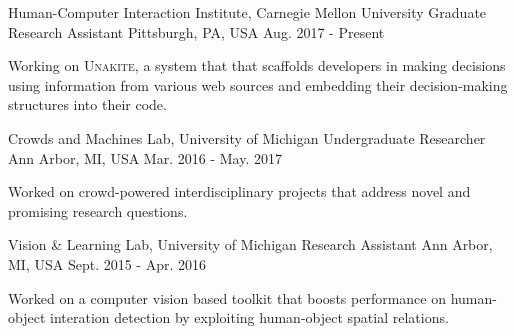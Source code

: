 
\begin{cventries}
\cventry
  {Human-Computer Interaction Institute, Carnegie Mellon University} %
  {Graduate Research Assistant} %
  {Pittsburgh, PA, USA} %
  {Aug. 2017 - Present} %
  {
    \begin{cvitems} %
      \item {Working on \textsc{Unakite}, a system that that scaffolds developers in making decisions using information from various web sources and embedding their decision-making structures into their code.}
    \end{cvitems}
  }

\cventry
  {Crowds and Machines Lab, University of Michigan} %
  {Undergraduate Researcher} %
  {Ann Arbor, MI, USA} %
  {Mar. 2016 - May. 2017} %
  {
    \begin{cvitems} %
      \item {Worked on crowd-powered interdisciplinary projects that address novel and promising research questions.}
    \end{cvitems}
  }

\cventry
  {Vision \& Learning Lab, University of Michigan} %
  {Research Assistant} %
  {Ann Arbor, MI, USA} %
  {Sept. 2015 - Apr. 2016} %
  {
    \begin{cvitems} %
      \item {Worked on a computer vision based toolkit that boosts performance on human-object interation detection by exploiting human-object spatial relations.}
    \end{cvitems}
  }
\end{cventries}



